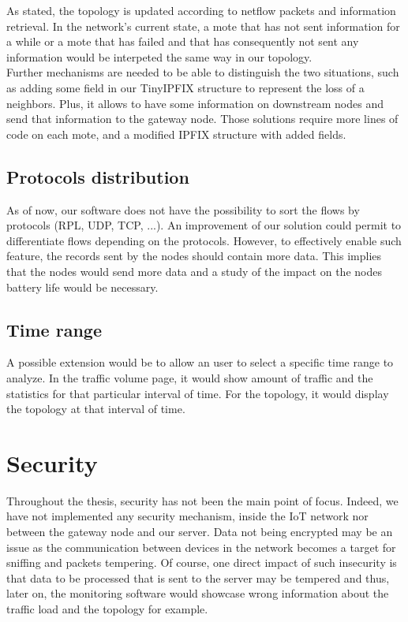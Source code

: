 As stated, the topology is updated according to netflow packets and information retrieval. In the network's current state, a mote that has not sent information for a while or a mote that has failed and that has consequently not sent any information would be interpeted the same way in our topology. \\

Further mechanisms are needed to be able to distinguish the two situations, such as adding some field in our TinyIPFIX structure to represent the loss of a neighbors. Plus, it allows to have some information on downstream nodes and send that information to the gateway node. Those solutions require more lines of code on each mote, and a modified IPFIX structure with added fields.

\subsection*{Protocols distribution}

As of now, our software does not have the possibility to sort the flows by protocols (RPL, UDP, TCP, ...). An improvement of our solution could permit to differentiate flows depending on the protocols. However, to effectively enable such feature, the records sent by the nodes should contain more data. This implies that the nodes would send more data and a study of the impact on the nodes battery life would be necessary.

\subsection*{Time range}

A possible extension would be to allow an user to select a specific time range to analyze. In the traffic volume page, it would show amount of traffic and the statistics for that particular interval of time. For the topology, it would display the topology at that interval of time.

\section{Security}

Throughout the thesis, security has not been the main point of focus. Indeed, we have not implemented any security mechanism, inside the IoT network nor between the gateway node and our server. Data not being encrypted may be an issue as the communication between devices in the network becomes a target for sniffing and packets tempering. Of course, one direct impact of such insecurity is that data to be processed that is sent to the server may be tempered and thus, later on, the monitoring software would showcase wrong information about the traffic load and the topology for example.\\

